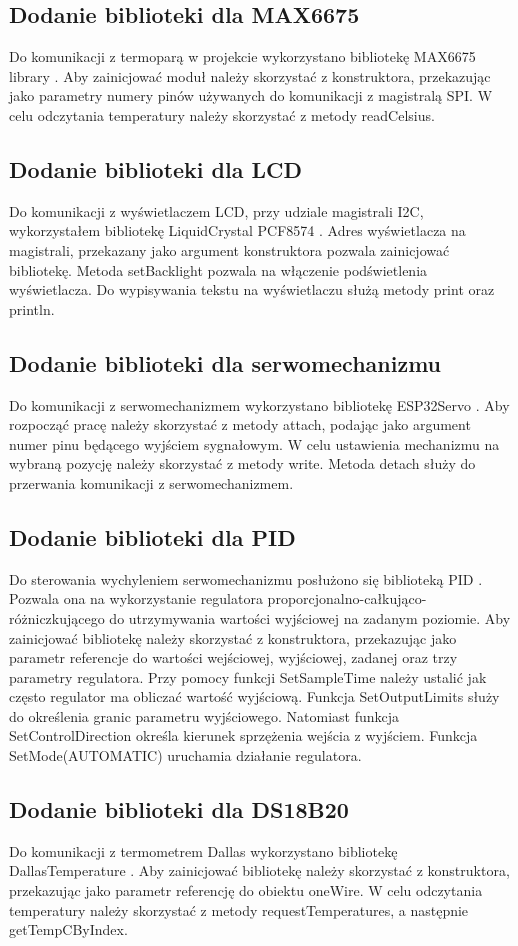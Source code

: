 \documentclass[11pt]{report}
\begin{document}
 \subsection{Dodanie biblioteki dla MAX6675}
 Do komunikacji z termoparą w projekcie wykorzystano bibliotekę MAX6675 library \cite{MAX6675library}. Aby zainicjować moduł należy skorzystać z konstruktora, przekazując jako parametry numery pinów używanych do komunikacji z magistralą SPI.
 W celu odczytania temperatury należy skorzystać z metody readCelsius.
 \subsection{Dodanie biblioteki dla LCD}
 Do komunikacji z wyświetlaczem LCD, przy udziale magistrali I2C, wykorzystałem bibliotekę LiquidCrystal PCF8574 \cite{LCDlibrary}. Adres wyświetlacza na magistrali, przekazany jako argument konstruktora pozwala zainicjować bibliotekę. Metoda setBacklight pozwala na włączenie podświetlenia wyświetlacza. Do wypisywania tekstu na wyświetlaczu służą metody print oraz println.
 \subsection{Dodanie biblioteki dla serwomechanizmu}
 Do komunikacji z serwomechanizmem wykorzystano bibliotekę ESP32Servo \cite{Servolibrary}. Aby rozpocząć pracę należy skorzystać z metody attach, podając jako argument numer pinu będącego wyjściem sygnałowym. W celu ustawienia mechanizmu na wybraną pozycję należy skorzystać z metody write. Metoda detach służy do przerwania komunikacji z serwomechanizmem.
 \subsection{Dodanie biblioteki dla PID}
 Do sterowania wychyleniem serwomechanizmu posłużono się biblioteką PID \cite{PIDlibrary}. Pozwala ona na wykorzystanie regulatora proporcjonalno-całkująco-różniczkującego do utrzymywania wartości wyjściowej na zadanym poziomie.
 Aby zainicjować bibliotekę  należy skorzystać z konstruktora, przekazując jako parametr referencje do wartości wejściowej, wyjściowej, zadanej oraz trzy parametry regulatora. Przy pomocy funkcji SetSampleTime należy ustalić jak często regulator ma obliczać wartość wyjściową. Funkcja SetOutputLimits służy do określenia granic parametru wyjściowego. Natomiast funkcja SetControlDirection określa kierunek sprzężenia wejścia z wyjściem. Funkcja SetMode(AUTOMATIC) uruchamia działanie regulatora.
 \subsection{Dodanie biblioteki dla DS18B20}
 Do komunikacji z termometrem Dallas wykorzystano bibliotekę DallasTemperature \cite{dallaslibrary}. Aby zainicjować bibliotekę należy skorzystać z konstruktora, przekazując jako parametr referencję do obiektu oneWire. W celu odczytania temperatury należy skorzystać z metody requestTemperatures, a następnie getTempCByIndex.
\end{document}

